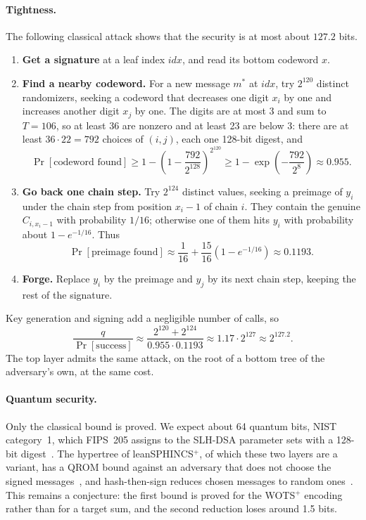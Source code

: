 \documentclass[11pt]{article}
\newcommand{\idx}{\mathit{idx}}
\begin{document}
\paragraph{Tightness.} The following classical attack shows that the security is at most about $127.2$ bits.
\begin{enumerate}
  \item \textbf{Get a signature} at a leaf index $\idx$, and read its bottom codeword $x$.
  \item \textbf{Find a nearby codeword.} For a new message $m^*$ at $\idx$, try $2^{120}$ distinct randomizers, seeking a codeword that decreases one digit $x_i$ by one and increases another digit $x_j$ by one. The digits are at most $3$ and sum to $T=106$, so at least 36 are nonzero and at least 23 are below 3: there are at least $36\cdot22=792$ choices of $(i,j)$, each one 128-bit digest, and
  \[
    \Pr[\text{codeword found}]\geq1-\left(1-\frac{792}{2^{128}}\right)^{2^{120}}\geq1-\exp\!\left(-\frac{792}{2^8}\right)\approx0.955.
  \]
  \item \textbf{Go back one chain step.} Try $2^{124}$ distinct values, seeking a preimage of $y_i$ under the chain step from position $x_i-1$ of chain $i$. They contain the genuine $C_{i,x_i-1}$ with probability $1/16$; otherwise one of them hits $y_i$ with probability about $1-e^{-1/16}$. Thus
  \[
    \Pr[\text{preimage found}]\approx\frac{1}{16}+\frac{15}{16}\left(1-e^{-1/16}\right)\approx0.1193.
  \]
  \item \textbf{Forge.} Replace $y_i$ by the preimage and $y_j$ by its next chain step, keeping the rest of the signature.
\end{enumerate}
Key generation and signing add a negligible number of calls, so
\[
  \frac{q}{\Pr[\text{success}]}\approx\frac{2^{120}+2^{124}}{0.955\cdot0.1193}\approx1.17\cdot2^{127}\approx2^{127.2}.
\]
The top layer admits the same attack, on the root of a bottom tree of the adversary's own, at the same cost.

\paragraph{Quantum security.} Only the classical bound is proved. We expect about 64 quantum bits, NIST category~1, which FIPS~205 assigns to the SLH-DSA parameter sets with a 128-bit digest~\cite{FIPS205}. The hypertree of leanSPHINCS$^+$, of which these two layers are a variant, has a QROM bound against an adversary that does not choose the signed messages~\cite{HK22}, and hash-then-sign reduces chosen messages to random ones~\cite{GHHM21}. This remains a conjecture: the first bound is proved for the WOTS$^+$ encoding rather than for a target sum, and the second reduction loses around 1.5 bits.
\end{document}
